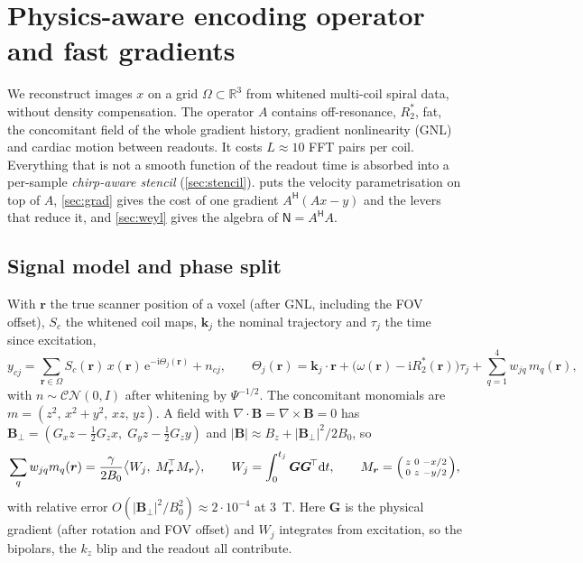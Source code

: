 \documentclass[11pt]{article}
\theoremstyle{remark}
\newcommand{\rr}{\bm r}
\newcommand{\kk}{\bm k}
\newcommand{\ii}{\mathrm i}
\newcommand{\ee}{\mathrm e}
\newcommand{\dd}{\mathrm d}
\newcommand{\Nop}{\mathsf N}
\newcommand{\herm}{\mathsf H}
\newcommand{\RR}{\mathbb R}
\begin{document}
\section{Physics-aware encoding operator and fast gradients}
\label{sec:operator}

We reconstruct images $x$ on a grid $\Omega\subset\RR^3$ from whitened multi-coil spiral data, without density compensation.
The operator $A$ contains off-resonance, $R_2^*$, fat, the concomitant field of the whole gradient history, gradient nonlinearity
(GNL) and cardiac motion between readouts. It costs $L\approx10$ FFT pairs per coil. Everything that is not a smooth function of the
readout time is absorbed into a per-sample \emph{chirp-aware stencil} (\cref{sec:stencil}).  puts the
velocity parametrisation on top of $A$, \cref{sec:grad} gives the cost of one gradient $A^\herm(Ax-y)$ and the levers that reduce it,
and \cref{sec:weyl} gives the algebra of $\Nop=A^\herm A$.

\subsection{Signal model and phase split}
\label{sec:signal}

With $\rr$ the true scanner position of a voxel (after GNL, including the FOV offset), $S_c$ the whitened coil maps, $\kk_j$ the nominal
trajectory and $\tau_j$ the time since excitation,
\begin{equation}
  y_{cj}=\sum_{\rr\in\Omega}S_c(\rr)\,x(\rr)\,\ee^{-\ii\Theta_j(\rr)}+n_{cj},\qquad
  \Theta_j(\rr)=\kk_j\!\cdot\!\rr+\bigl(\omega(\rr)-\ii R_2^*(\rr)\bigr)\tau_j+\sum_{q=1}^4w_{jq}\,m_q(\rr),
  \label{eq:signal}
\end{equation}
with $n\sim\mathcal{CN}(0,I)$ after whitening by $\Psi^{-1/2}$. The concomitant monomials are $m=(z^2,\,x^2{+}y^2,\,xz,\,yz)$. A field with $\nabla\!\cdot\!\bm B=\nabla\!\times\!\bm B=0$ has
$\bm B_\perp=(G_xz-\tfrac12G_zx,\;G_yz-\tfrac12G_zy)$ and $|\bm B|\approx B_z+|\bm B_\perp|^2/2B_0$, so~\cite{norris1990,bernstein1998}
\begin{equation}
  \sum_qw_{jq}m_q(\rr)=\frac{\gamma}{2B_0}\bigl\langle W_j,\;M_{\rr}^{\!\top}M_{\rr}\bigr\rangle,\qquad
  W_j=\int_0^{t_j}\bm G\bm G^{\!\top}\dd t,\qquad
  M_{\rr}=\begin{psmallmatrix}z&0&-x/2\\0&z&-y/2\end{psmallmatrix},
  \label{eq:wq}
\end{equation}
with relative error $O(|\bm B_\perp|^2/B_0^2)\approx2\cdot10^{-4}$ at 3~T. Here $\bm G$ is the physical gradient (after rotation and FOV offset) and $W_j$ integrates from excitation, so the bipolars, the $k_z$ blip and the readout all contribute.
\end{document}
